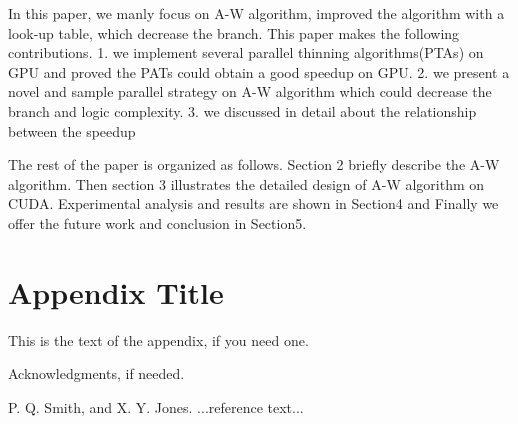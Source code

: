 \documentclass{sigplanconf}
\begin{document}
    In this paper, we manly focus on A-W algorithm, improved the algorithm with a look-up table, which decrease the branch. This paper makes the following contributions.
1. we implement several parallel thinning algorithms(PTAs) on GPU and proved the PATs could obtain a good speedup on GPU.
2. we present a novel and sample parallel strategy on A-W algorithm which could decrease the branch and logic complexity.
3.  we discussed in detail about the relationship between the speedup 

The rest of the paper is organized as follows. Section 2 briefly describe the A-W algorithm. Then section 3 illustrates the detailed design of A-W algorithm on CUDA. Experimental analysis and results are shown in Section4 and Finally we offer the future work and conclusion in Section5.



\appendix
\section{Appendix Title}

This is the text of the appendix, if you need one.

\acks

Acknowledgments, if needed.





\begin{thebibliography}{}
\softraggedright

P. Q. Smith, and X. Y. Jones. ...reference text...

\end{thebibliography}
\end{document}
